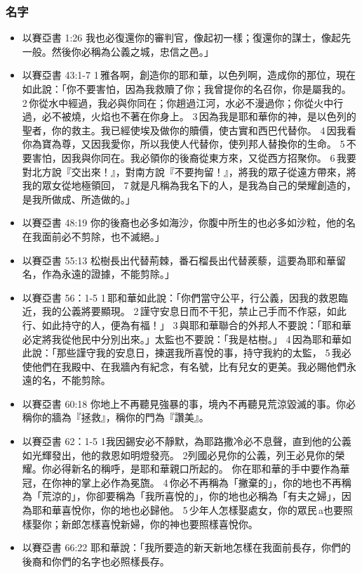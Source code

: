 \subsubsection{名字}
\begin{itemize} 
\itemsep-.25em
\item 以賽亞書 1:26
我也必復還你的審判官，像起初一樣；復還你的謀士，像起先一般。然後你必稱為公義之城，忠信之邑。」
\item 以賽亞書 43:1-7
1 雅各啊，創造你的耶和華，以色列啊，造成你的那位，現在如此說：「你不要害怕，因為我救贖了你；我曾提你的名召你，你是屬我的。 2 你從水中經過，我必與你同在；你趟過江河，水必不漫過你；你從火中行過，必不被燒，火焰也不著在你身上。 3 因為我是耶和華你的神，是以色列的聖者，你的救主。我已經使埃及做你的贖價，使古實和西巴代替你。 4 因我看你為寶為尊，又因我愛你，所以我使人代替你，使列邦人替換你的生命。 5 不要害怕，因我與你同在。我必領你的後裔從東方來，又從西方招聚你。 6 我要對北方說『交出來！』，對南方說『不要拘留！』，將我的眾子從遠方帶來，將我的眾女從地極領回， 7 就是凡稱為我名下的人，是我為自己的榮耀創造的，是我所做成、所造做的。」
\item 以賽亞書 48:19
你的後裔也必多如海沙，你腹中所生的也必多如沙粒，他的名在我面前必不剪除，也不滅絕。」
\item 以賽亞書 55:13
松樹長出代替荊棘，番石榴長出代替蒺藜，這要為耶和華留名，作為永遠的證據，不能剪除。」
\item 以賽亞書 56：1-5
1 耶和華如此說：「你們當守公平，行公義，因我的救恩臨近，我的公義將要顯現。 2 謹守安息日而不干犯，禁止己手而不作惡，如此行、如此持守的人，便為有福！」 3 與耶和華聯合的外邦人不要說：「耶和華必定將我從他民中分別出來。」太監也不要說：「我是枯樹。」 4 因為耶和華如此說：「那些謹守我的安息日，揀選我所喜悅的事，持守我約的太監， 5 我必使他們在我殿中、在我牆內有紀念，有名號，比有兒女的更美。我必賜他們永遠的名，不能剪除。
\item 以賽亞書 60:18
你地上不再聽見強暴的事，境內不再聽見荒涼毀滅的事。你必稱你的牆為『拯救』，稱你的門為『讚美』。
\item 以賽亞書 62：1-5
1我因錫安必不靜默，為耶路撒冷必不息聲，直到他的公義如光輝發出，他的救恩如明燈發亮。 2列國必見你的公義，列王必見你的榮耀。你必得新名的稱呼，是耶和華親口所起的。 你在耶和華的手中要作為華冠，在你神的掌上必作為冕旒。 4 你必不再稱為「撇棄的」，你的地也不再稱為「荒涼的」，你卻要稱為「我所喜悅的」，你的地也必稱為「有夫之婦」，因為耶和華喜悅你，你的地也必歸他。 5 少年人怎樣娶處女，你的眾民 a也要照樣娶你；新郎怎樣喜悅新婦，你的神也要照樣喜悅你。
\item 以賽亞書 66:22
耶和華說：「我所要造的新天新地怎樣在我面前長存，你們的後裔和你們的名字也必照樣長存。

\end{itemize}
